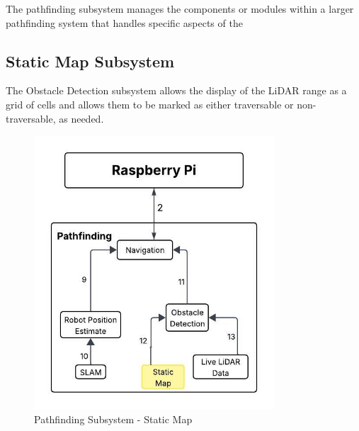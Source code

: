 
The pathfinding subsystem manages the components or modules within a larger pathfinding system that handles specific aspects of the 

\subsection{Static Map Subsystem}
The Obstacle Detection subsystem allows the display of the LiDAR range as a grid of cells and allows them to be marked as either traversable or non-traversable, as needed.



\begin{figure}[h!]
	\centering
 	\includegraphics[width=0.80\textwidth]{images/pathfinding 2/Data_Flow_StaticMap.jpeg}
 \caption{Pathfinding Subsystem - Static Map} %
\end{figure}


